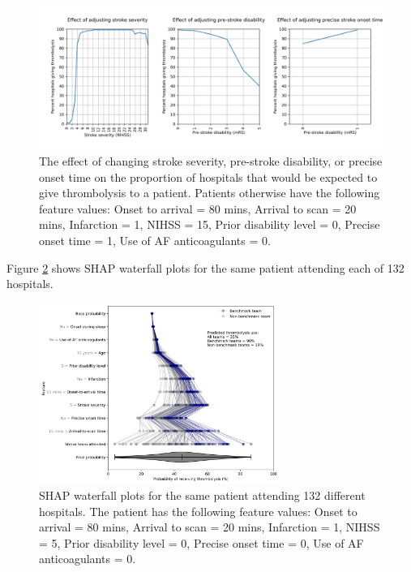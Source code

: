 \begin{figure}
\centering
\includegraphics[width=1\textwidth]{./images/20_synthetic_xgb_10_features_IVT_rate_vs_feature_values}
\caption{The effect of changing stroke severity, pre-stroke disability, or precise onset time on the proportion of hospitals that would be expected to give thrombolysis to a patient. Patients otherwise have the following feature values: Onset to arrival = 80 mins, Arrival to scan = 20 mins, Infarction = 1, NIHSS = 15, Prior disability level = 0, Precise onset time = 1, Use of AF anticoagulants = 0.}
\label{fig:artificial_1}
\end{figure}

Figure \ref{fig:artificial_shap_waterfall_with_violin} shows SHAP waterfall plots for the same patient attending each of 132 hospitals.

\begin{figure}
\centering
\includegraphics[width=0.7\textwidth]{./images/21_shap_waterfall_with_violin_contentious}
\caption{SHAP waterfall plots for the same patient attending 132 different hospitals. The patient has the following feature values: Onset to arrival = 80 mins, Arrival to scan = 20 mins, Infarction = 1, NIHSS = 5, Prior disability level = 0, Precise onset time = 0, Use of AF anticoagulants = 0.}
\label{fig:artificial_shap_waterfall_with_violin}
\end{figure}


